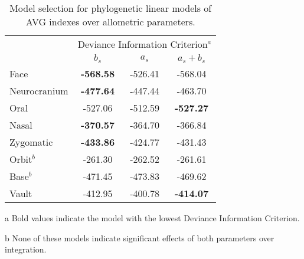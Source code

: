\begin{table}[ht]
  \centering
  \begin{threeparttable}
    \caption{Model selection for phylogenetic linear models of AVG indexes over allometric parameters. \label{tab:dic_allo_im}}
    \begin{tabular}{lccc}
      \toprule
      & \multicolumn{3}{c}{\small{Deviance Information Criterion$^{a}$}} \\
      & $b_s$ & $a_s$ & $a_s + b_s$ \\ 
      \midrule
      Face & {\bf -568.58} & -526.41 & -568.04 \\ 
      Neurocranium & {\bf -477.64} & -447.44 & -463.70 \\ 
      Oral & -527.06 & -512.59 & {\bf -527.27} \\ 
      Nasal & {\bf -370.57} & -364.70 & -366.84 \\ 
      Zygomatic & {\bf -433.86} & -424.77 & -431.43 \\ 
      Orbit$^{b}$ & -261.30 & -262.52 & -261.61 \\ 
      Base$^{b}$ & -471.45 & -473.83 & -469.62 \\ 
      Vault & -412.95 & -400.78 & {\bf -414.07} \\ 
      \bottomrule
    \end{tabular}
    \begin{tablenotes}
      \footnotesize{
        \item [a] Bold values indicate the model with the lowest Deviance Information Criterion.
        \item [b] None of these models indicate significant effects of both parameters over integration.
        }
    \end{tablenotes}
  \end{threeparttable}
\end{table}